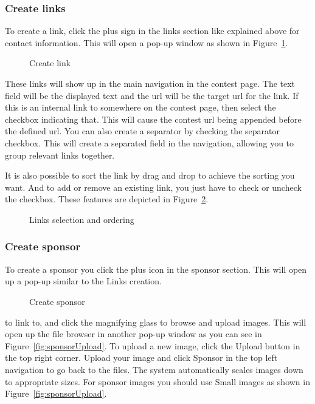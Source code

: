 \subsubsection{Create links}

To create a link, click the plus sign in the links section like
explained above for contact information. This will open a pop-up window
as shown in Figure~\ref{fig:createLink}.

\begin{figure}
\centering
	\caption{Create link}
	\label{fig:createLink}
\end{figure}

These links will show up in the main navigation in the contest page. The
text field will be the displayed text and the url will be the target
url for the link. If this is an internal link to somewhere on the
contest page, then select the checkbox indicating that. This will cause
the contest url being appended before the defined url. You can also
create a separator by checking the separator checkbox. This will create
a separated field in the navigation, allowing you to group relevant
links together.

It is also possible to sort the link by drag and drop to achieve the
sorting you want. And to add or remove an existing link, you just have
to check or uncheck the checkbox. These features are depicted in Figure~\ref{fig:linkSelectOrder}.

\begin{figure}
\centering
	\caption{Links selection and ordering}
	\label{fig:linkSelectOrder}
\end{figure}

\subsubsection{Create sponsor}

To create a sponsor you click the plus icon in the sponsor section. This
will open up a pop-up similar to the Links creation. 

\begin{figure}
\centering
 	\caption{Create sponsor}
 	\label{fig:createSponsor}
\end{figure}

to link to, and click the magnifying glass to browse and upload images.
This will open up the file browser in another pop-up window as you can
see in Figure~\ref{fig:sponsorUpload}. To upload a new image, click the Upload button in
the top right corner. Upload your image and click Sponsor in the top
left navigation to go back to the files. The system automatically
scales images down to appropriate sizes. For sponsor images you should
use Small images as shown in Figure~\ref{fig:sponsorUpload}. 

